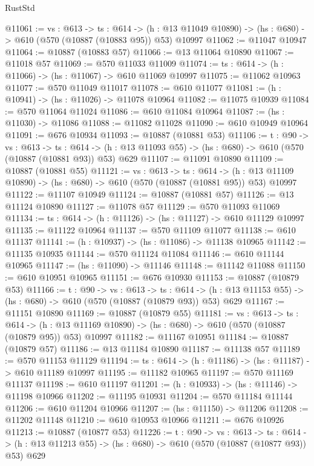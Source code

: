 \begin{lexlean}{RustStd}
\begin{coremodule}
@11061 := {vs : @613} ->
  {ts : @614} ->
  (h : @13 @11049 @10890) -> (hs : @680) -> @610 (@570 (@10887 (@10883 @95)) @53) @10997
@11062 := @11047 @10947
@11064 := @10887 (@10883 @57)
@11066 := @13 @11064 @10890
@11067 := @11018 @57
@11069 := @570 @11033 @11009
@11074 := {ts : @614} -> (h : @11066) -> (hs : @11067) -> @610 @11069 @10997
@11075 := @11062 @10963
@11077 := @570 @11049 @11017
@11078 := @610 @11077
@11081 := (h : @10941) -> (hs : @11026) -> @11078 @10964
@11082 := @11075 @10939
@11084 := @570 @11064 @11024
@11086 := @610 @11084 @10964
@11087 := (hs : @11030) -> @11086
@11088 := @11082 @11028
@11090 := @610 @10949 @10964
@11091 := @676 @10934
@11093 := @10887 (@10881 @53)
@11106 := {t : @90} ->
  {vs : @613} ->
  {ts : @614} -> (h : @13 @11093 @55) -> (hs : @680) -> @610 (@570 (@10887 (@10881 @93)) @53) @629
@11107 := @11091 @10890
@11109 := @10887 (@10881 @55)
@11121 := {vs : @613} ->
  {ts : @614} ->
  (h : @13 @11109 @10890) -> (hs : @680) -> @610 (@570 (@10887 (@10881 @95)) @53) @10997
@11122 := @11107 @10949
@11124 := @10887 (@10881 @57)
@11126 := @13 @11124 @10890
@11127 := @11078 @57
@11129 := @570 @11093 @11069
@11134 := {ts : @614} -> (h : @11126) -> (hs : @11127) -> @610 @11129 @10997
@11135 := @11122 @10964
@11137 := @570 @11109 @11077
@11138 := @610 @11137
@11141 := (h : @10937) -> (hs : @11086) -> @11138 @10965
@11142 := @11135 @10935
@11144 := @570 @11124 @11084
@11146 := @610 @11144 @10965
@11147 := (hs : @11090) -> @11146
@11148 := @11142 @11088
@11150 := @610 @10951 @10965
@11151 := @676 @10930
@11153 := @10887 (@10879 @53)
@11166 := {t : @90} ->
  {vs : @613} ->
  {ts : @614} -> (h : @13 @11153 @55) -> (hs : @680) -> @610 (@570 (@10887 (@10879 @93)) @53) @629
@11167 := @11151 @10890
@11169 := @10887 (@10879 @55)
@11181 := {vs : @613} ->
  {ts : @614} ->
  (h : @13 @11169 @10890) -> (hs : @680) -> @610 (@570 (@10887 (@10879 @95)) @53) @10997
@11182 := @11167 @10951
@11184 := @10887 (@10879 @57)
@11186 := @13 @11184 @10890
@11187 := @11138 @57
@11189 := @570 @11153 @11129
@11194 := {ts : @614} -> (h : @11186) -> (hs : @11187) -> @610 @11189 @10997
@11195 := @11182 @10965
@11197 := @570 @11169 @11137
@11198 := @610 @11197
@11201 := (h : @10933) -> (hs : @11146) -> @11198 @10966
@11202 := @11195 @10931
@11204 := @570 @11184 @11144
@11206 := @610 @11204 @10966
@11207 := (hs : @11150) -> @11206
@11208 := @11202 @11148
@11210 := @610 @10953 @10966
@11211 := @676 @10926
@11213 := @10887 (@10877 @53)
@11226 := {t : @90} ->
  {vs : @613} ->
  {ts : @614} -> (h : @13 @11213 @55) -> (hs : @680) -> @610 (@570 (@10887 (@10877 @93)) @53) @629

\end{coremodule}
\end{lexlean}
